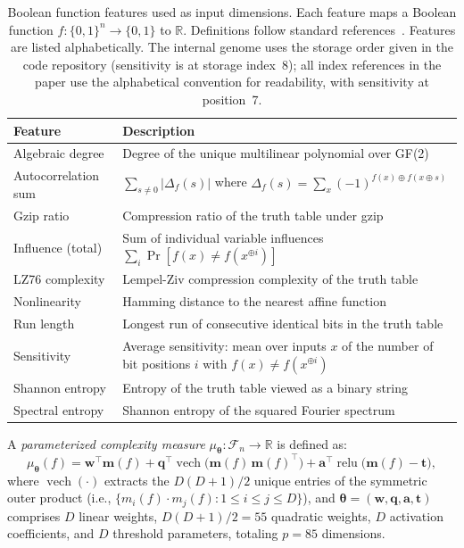 \documentclass[twoside]{article}
\newcommand{\R}{\mathbb{R}}
\newcommand{\btheta}{\boldsymbol{\theta}}
\newcommand{\calF}{\mathcal{F}}
\begin{document}
\begin{table}[t]
\caption{Boolean function features used as input dimensions. Each feature
maps a Boolean function $f : \{0,1\}^n \to \{0,1\}$ to $\R$. Definitions
follow standard references~\citep{boppana1990complexity,jukna2012boolean}.
Features are listed alphabetically.
The internal genome uses the storage order given in the code repository
(sensitivity is at storage index~8); all index references in the paper use
the alphabetical convention for readability, with sensitivity at
position~7.}
\label{tab:features}
\centering
\small
\begin{tabular}{lp{8cm}}
\toprule
Feature & Description \\
\midrule
Algebraic degree & Degree of the unique multilinear polynomial over GF(2) \\
Autocorrelation sum & $\sum_{s \neq 0} |\Delta_f(s)|$ where $\Delta_f(s) = \sum_x (-1)^{f(x) \oplus f(x \oplus s)}$ \\
Gzip ratio & Compression ratio of the truth table under gzip \\
Influence (total) & Sum of individual variable influences $\sum_i \Pr[f(x) \neq f(x^{\oplus i})]$ \\
LZ76 complexity & Lempel-Ziv compression complexity of the truth table \\
Nonlinearity & Hamming distance to the nearest affine function \\
Run length & Longest run of consecutive identical bits in the truth table \\
Sensitivity & Average sensitivity: mean over inputs $x$ of the number of bit positions $i$ with $f(x) \neq f(x^{\oplus i})$ \\
Shannon entropy & Entropy of the truth table viewed as a binary string \\
Spectral entropy & Shannon entropy of the squared Fourier spectrum \\
\bottomrule
\end{tabular}
\end{table}

A \emph{parameterized complexity measure} $\mu_\btheta : \calF_n \to \R$ is defined as:
\begin{equation}
\label{eq:measure}
\mu_\btheta(f) = \mathbf{w}^\top \mathbf{m}(f)
  + \mathbf{q}^\top \operatorname{vech}\bigl(\mathbf{m}(f)\,\mathbf{m}(f)^\top\bigr)
  + \mathbf{a}^\top \operatorname{relu}\bigl(\mathbf{m}(f) - \mathbf{t}\bigr),
\end{equation}
where $\operatorname{vech}(\cdot)$ extracts the $D(D+1)/2$ unique entries of the
symmetric outer product (i.e., $\{m_i(f) \cdot m_j(f) : 1 \leq i \leq j \leq D\}$), and $\btheta = (\mathbf{w}, \mathbf{q}, \mathbf{a}, \mathbf{t})$
comprises $D$ linear weights, $D(D+1)/2 = 55$ quadratic weights, $D$ activation
coefficients, and $D$ threshold parameters, totaling $p = 85$ dimensions.
\end{document}
